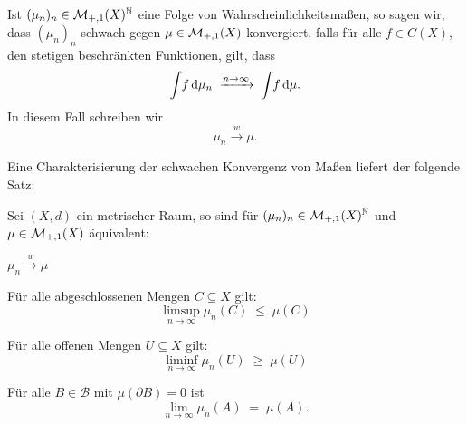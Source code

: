 \documentclass[../main/main.tex]{subfiles}
\begin{document}
	\begin{Definition}
		Ist $(\mu_n)_n \in \mathcal{M}_{+,1}(X)^{\mathbb{N}}$ eine Folge von Wahrscheinlichkeitsmaßen,
		 so sagen wir, dass $(\mu_n)_n$ 
		schwach gegen $\mu \in \mathcal{M}_{+,1}(X)$ konvergiert, falls für alle $f \in C(X)$, 
		den stetigen beschränkten Funktionen, gilt, dass
		$$\int_{} \, f \, \mathrm{d}\mu_n \; \xrightarrow{n \to \infty} \; \int_{} \, f \, \mathrm{d}\mu \text{.}$$
		In diesem Fall schreiben wir
		$$\mu_n \xrightarrow{w} \mu \text{.}$$
	\end{Definition}

	Eine Charakterisierung der schwachen Konvergenz von Maßen liefert der folgende Satz:

	\begin{Satz}[Portmanteau]
		Sei $(X, d)$ ein metrischer Raum, so sind für $(\mu_n)_n \in \mathcal{M}_{+,1}(X)^{\mathbb{N}}$ 
		und $\mu \in \mathcal{M}_{+,1}(X)$ äquivalent:
		\begin{equivalentthm}
			\item $\mu_n \xrightarrow{w} \mu$
			\item Für alle abgeschlossenen Mengen $C \subseteq X$ gilt: 
				$$\limsup_{n \to \infty} \mu_n(C) \; \leq \; \mu(C)$$
			\item Für alle offenen Mengen $U \subseteq X$ gilt: 
				$$\liminf_{n \to \infty} \mu_n(U) \; \geq \; \mu(U)$$
			\item Für alle $B \in \mathcal{B}$ mit $\mu(\partial B) = 0$ 
				ist $$\lim_{n \to \infty} \mu_n(A) \; = \; \mu(A) \text{.}$$
		\end{equivalentthm}
	\end{Satz}
\end{document}
